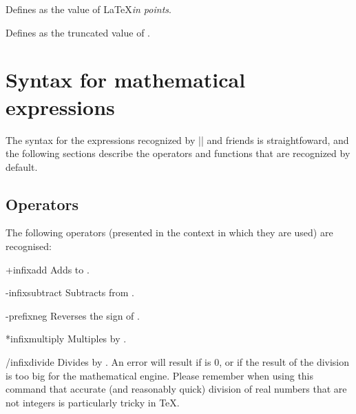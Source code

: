 \begin{command}{\pgfmathsetlengthmacro{}}
  Defines  as the value of  
  \LaTeX{}\emph{in points}.
\end{command}

\begin{command}{\pgfmathtruncatemacro{}}
  Defines  as the truncated value of .
\end{command}



\section{Syntax for mathematical expressions} 

\label{pgfmath-syntax}

  The syntax for the expressions recognized by |\pgfmathparse| and 
  friends is straightfoward, and the following sections describe the
  operators and functions that are recognized by default.
  
\subsection{Operators}

\label{pgfmath-operators}

  The following operators (presented in the context in which they are used)
  are recognised:
  
\begin{math-operator}{+}{infix}{add}
 Adds  to .
\end{math-operator}

\begin{math-operator}{-}{infix}{subtract}
  Subtracts  from .
\end{math-operator}

\begin{math-operator}{-}{prefix}{neg}
  Reverses the sign of .
\end{math-operator}

\begin{math-operator}{*}{infix}{multiply}
  Multiples  by .
\end{math-operator}

\begin{math-operator}{/}{infix}{divide}
  Divides  by . An error will result if  is 0,
  or if the result of the division is too big for the mathematical 
  engine. Please remember when using this command that accurate (and
  reasonably quick) division of real numbers that are not integers 
  is particularly tricky in \TeX.
\end{math-operator}


